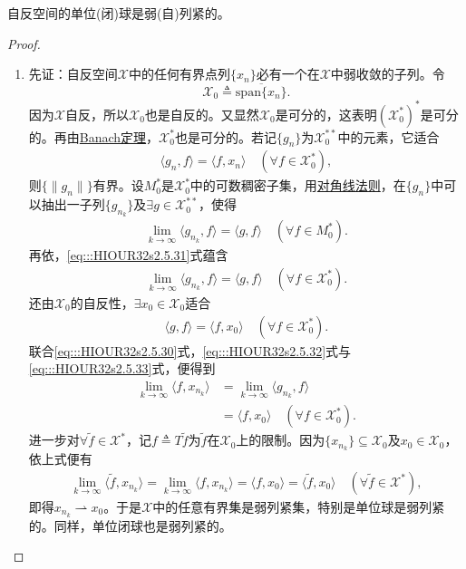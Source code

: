 \documentclass[../../main.tex]{subfiles}%
\begin{document}
\begin{theorem}\label{theorem:Eberlein-Smulian定理}
自反空间的单位(闭)球是弱(自)列紧的。
\end{theorem}
\begin{proof}
\begin{enumerate}[(1)]
\item 先证：自反空间$\mathscr{X}$中的任何有界点列$\{x_n\}$必有一个在$\mathscr{X}$中弱收敛的子列。令
$$\mathscr{X}_0\triangleq\overline{\mathrm{span}\{x_n\}}.$$
因为$\mathscr{X}$自反，所以$\mathscr{X}_0$也是自反的。又显然$\mathscr{X}_0$是可分的，这表明$(\mathscr{X}_0^*)^*$是可分的。再由\hyperref[theorem:泛函分析------Banach定理]{Banach定理}，$\mathscr{X}_0^*$也是可分的。若记$\{g_n\}$为$\mathscr{X}_0^{**}$中的元素，它适合
\begin{align}
\langle g_n,f\rangle=\langle f,x_n\rangle\quad(\forall f\in\mathscr{X}_0^*),\label{eq:::HIOUR32s2.5.30}
\end{align}
则$\{\|g_n\|\}$有界。设$M_0^*$是$\mathscr{X}_0^*$中的可数稠密子集，用\hyperref[proposition:对角线法则]{对角线法则}，在$\{g_n\}$中可以抽出一子列$\{g_{n_k}\}$及$\exists g\in\mathscr{X}_0^{**}$，使得
\begin{align}
\lim\limits_{k\to\infty}\langle g_{n_k},f\rangle=\langle g,f\rangle\quad(\forall f\in M_0^*).\label{eq:::HIOUR32s2.5.31}
\end{align}
再依，\eqref{eq:::HIOUR32s2.5.31}式蕴含
\begin{align}
\lim\limits_{k\to\infty}\langle g_{n_k},f\rangle=\langle g,f\rangle\quad(\forall f\in\mathscr{X}_0^*).\label{eq:::HIOUR32s2.5.32}
\end{align}
还由$\mathscr{X}_0$的自反性，$\exists x_0\in\mathscr{X}_0$适合
\begin{align}
\langle g,f\rangle=\langle f,x_0\rangle\quad(\forall f\in\mathscr{X}_0^*).\label{eq:::HIOUR32s2.5.33}
\end{align}
联合\eqref{eq:::HIOUR32s2.5.30}式，\eqref{eq:::HIOUR32s2.5.32}式与\eqref{eq:::HIOUR32s2.5.33}式，便得到
\begin{align*}
\lim\limits_{k\to\infty}\langle f,x_{n_k}\rangle&=\lim\limits_{k\to\infty}\langle g_{n_k},f\rangle\\
&=\langle f,x_0\rangle\quad(\forall f\in\mathscr{X}_0^*).
\end{align*}
进一步对$\forall\widetilde{f}\in\mathscr{X}^*$，记$f\triangleq T\widetilde{f}$为$\widetilde{f}$在$\mathscr{X}_0$上的限制。因为$\{x_{n_k}\}\subseteq\mathscr{X}_0$及$x_0\in\mathscr{X}_0$，依上式便有
\begin{align*}
\lim\limits_{k\to\infty}\langle\widetilde{f},x_{n_k}\rangle=\lim\limits_{k\to\infty}\langle f,x_{n_k}\rangle
=\langle f,x_0\rangle=\langle\widetilde{f},x_0\rangle\quad(\forall\widetilde{f}\in\mathscr{X}^*),
\end{align*}
即得$x_{n_k}\rightharpoonup x_0$。于是$\mathscr{X}$中的任意有界集是弱列紧集，特别是单位球是弱列紧的。同样，单位闭球也是弱列紧的。


\end{enumerate}
\end{proof}
\end{document}
